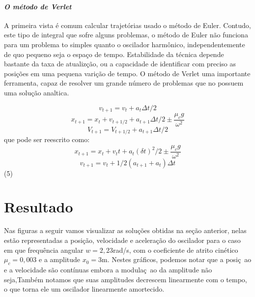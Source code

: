 \documentclass[a4paper]{article} %
\begin{document}
\paragraph{\textit{O m\'etodo de Verlet}} A primeira vista \'e comum calcular trajet\'orias usado o m\'etodo de Euler. Contudo, este tipo de integral que sofre alguns problemas, o  m\'etodo de Euler n\~ao funciona para um problema to simples quanto o oscilador harm\^onico, independentemente de quo pequeno seja o espa\c{c}o de tempo. Estabilidade da t\'ecnica depende bastante da taxa de atualiz\c{c}\~ao, ou a capacidade de identificar com preciso as posi\c{c}\~oes em uma pequena vari\c{c}\~ao de tempo. O m\'etodo de Verlet uma importante ferramenta, capaz de resolver um grande n\'umero de problemas que no possuem uma solu\c{c}\~ao analtica.

\[v_{t+1} = v_t + a_t\Delta{t}/2\]
\[x_{t+1} = x_t + v_{t+1/2} + a_{t+1}\Delta{t}/2 \pm \frac{\mu_cg}{\omega^2}\]
\[V_{t+1} = V_{t+1/2} + a_{t+1}\Delta{t}/2 \]
que pode ser reescrito como:
\[x_{t+1} = x_t + v_tt+a_t(\delta{t})^2/2 \pm \frac{\mu_cg}{\omega^2}\]
\[v_{t+1} = v_t + 1/2(a_{t+1}+a_t)\Delta{t}\](5)

\section{Resultado}

Nas figuras a seguir vamos visualizar as solu\c{c}\~oes obtidas na se\c{c}\~ao anterior, nelas est\~ao representadas a posi\c{c}\~ao, velocidade e acelera\c{c}\~ao do oscilador para o caso em que frequ\^encia angular $w = 2,23$rad/s, com o coeficiente de atrito cin\'etico $\mu_c = 0,003$ e a amplitude $x_0 = 3$m. Nestes
gr\'aficos, podemos notar que a posi\c{c}~ao e a velocidade s\~ao cont\'inuas embora a modula\c{c}~ao da amplitude n\~ao seja,Tamb\'em notamos que suas amplitudes decrescem linearmente com o tempo, o que torna ele um oscilador linearmente amortecido.
\end{document}
